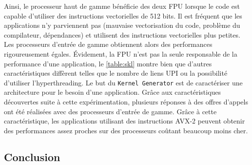         
        
       Ainsi, le processeur haut de gamme bénéficie des deux FPU lorsque le code est capable d'utiliser des instructions vectorielles de 512 bits. Il est fréquent que les applications n'y parviennent pas (mauvaise vectorisation du code, problème du compilateur, dépendances) et utilisent des instructions vectorielles plus petites. Les processeurs d'entrée de gamme obtiennent alors des performances rigoureusement égales. Évidement, la FPU n'est pas la seule responsable de la performance d'une application, le \autoref{table:skl} montre bien que d'autres caractéristiques diffèrent telles que le nombre de liens UPI ou la possibilité d'utiliser l'hyperthreading. Le but du \verb|Kernel Generator| est de caractériser une architecture pour le besoin d'une application. Grâce aux caractéristiques découvertes suite à cette expérimentation, plusieurs réponses à des offres d'appels ont été réalisées avec des processeurs d'entrée de gamme. Grâce à cette caractéristique, les applications utilisant des instructions AVX-2 peuvent obtenir des performances assez proches sur des processeurs coûtant beaucoup moins cher.


        
        




    
    


\subsection{Conclusion}
    
